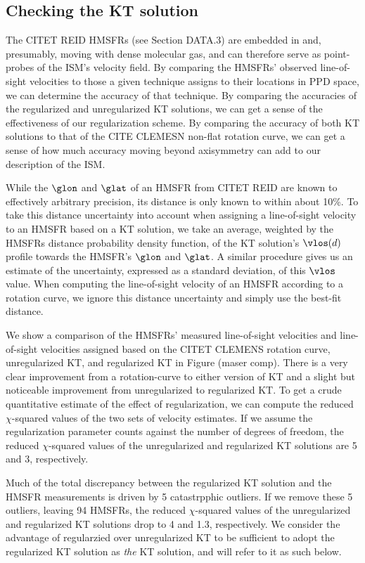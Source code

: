 \subsection{Checking the KT solution}
\label{sec:KT-validation}

The CITET REID HMSFRs (see Section DATA.3) are embedded in and, presumably, moving with dense molecular gas, and can therefore serve as point-probes of the ISM's velocity field. 
By comparing the HMSFRs' observed line-of-sight velocities to those a given technique assigns to their locations in PPD space, we can determine the accuracy of that technique. 
By comparing the accuracies of the regularized and unregularized KT solutions, we can get a sense of the effectiveness of our regularization scheme. 
By comparing the accuracy of both KT solutions to that of the CITE CLEMESN non-flat rotation curve, we can get a sense of how much accuracy moving beyond axisymmetry can add to our description of the ISM. 

While the $\glon$ and $\glat$ of an HMSFR from CITET REID are known to effectively arbitrary precision, its distance is only known to within about 10\%. 
To take this distance uncertainty into account when assigning a line-of-sight velocity to an HMSFR based on a KT solution, we take an average, weighted by the HMSFRs distance probability density function, of the KT solution's $\vlos(d)$ profile towards the HMSFR's $\glon$ and $\glat$. 
A similar procedure gives us an estimate of the uncertainty, expressed as a standard deviation, of this $\vlos$ value. 
When computing the line-of-sight velocity of an HMSFR according to a rotation curve, we ignore this distance uncertainty and simply use the best-fit distance. 

We show a comparison of the HMSFRs' measured line-of-sight velocities and line-of-sight velocities assigned based on the CITET CLEMENS rotation curve, unregularized KT, and regularized KT in Figure (maser comp). 
There is a very clear improvement from a rotation-curve to either version of KT and a slight but noticeable improvement from unregularized to regularized KT. 
To get a crude quantitative estimate of the effect of regularization, we can compute the reduced $\chi$-squared values of the two sets of velocity estimates. 
If we assume the regularization parameter counts against the number of degrees of freedom, the reduced $\chi$-squared values of the unregularized and regularized KT solutions are 5 and 3, respectively. 

Much of the total discrepancy between the regularized KT solution and the HMSFR measurements is driven by 5 catastrpphic outliers. 
If we remove these 5 outliers, leaving 94 HMSFRs, the reduced $\chi$-squared values of the unregularized and regularized KT solutions drop to 4 and 1.3, respectively. 
We consider the advantage of regularzied over unregularized KT to be sufficient to adopt the regularized KT solution as \emph{the} KT solution, and will refer to it as such below.


